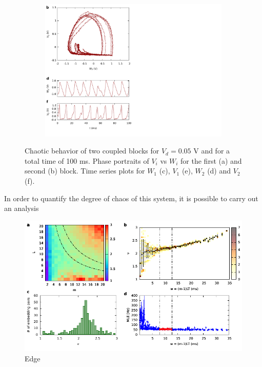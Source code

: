 \begin{figure}[H]
\begin{minipage}{.49\textwidth}
\begin{subfigure}{\linewidth}
            \includegraphics[width=\linewidth,trim={0cm 0 11cm 0},clip,center]
            {../2_blocks/4e4_points/plots/waveforms_2.pdf}
        \end{subfigure}
    \end{minipage}
    \caption{Chaotic behavior of two coupled blocks for
    $V_d=0.05$ V and for a total time of 100 ms. Phase portraits of $V_i$
    vs $W_i$ for the first (a) and second (b) block. Time series plots
    for $W_1$ (c), $V_1$ (e), $W_2$ (d) and $V_2$ (f).}
    \label{fig:2 blocks waveforms}
\end{figure}

In order to quantify the degree of chaos of this system, it is possible
to carry out an analysis

\begin{figure}[H]
    \centering
    \includegraphics[width=\linewidth]{../2_blocks/1e5_points/plots/chaos.pdf}
    \caption{Edge}
    \label{fig:2 blocks chaos}
\end{figure}


